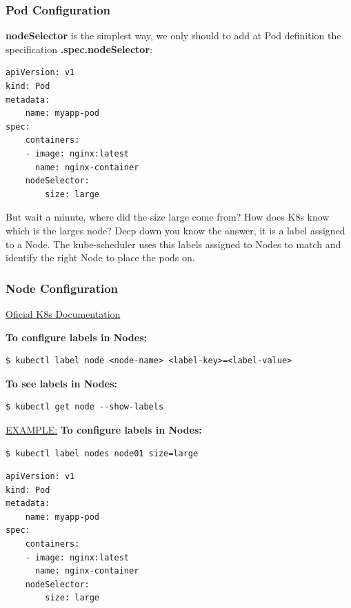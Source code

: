 \documentclass{article}
\newenvironment{codetemplate}[1][]{%
  \mybasecolorbox[#1]
  \itshape
}{%
  \endmybasecolorbox
}
\begin{document}
\subsubsection{Pod Configuration}
\textbf{nodeSelector} is the simplest way, we only should to add at Pod definition the specification \textbf{.spec.nodeSelector}:

\begin{codetemplate}{}
\begin{verbatim}
apiVersion: v1
kind: Pod
metadata:
    name: myapp-pod
spec:
    containers:
    - image: nginx:latest
      name: nginx-container
    nodeSelector:
        size: large
\end{verbatim}
\end{codetemplate}

But wait a minute, where did the size large come from? How does K8s know which is the larges node? Deep down you know the answer, it is a label assigned to a Node. The kube-scheduler uses this labels assigned to Nodes to match and identify the right Node to place the pods on.

\subsubsection{Node Configuration}

\href{https://kubernetes.io/docs/tasks/configure-pod-container/assign-pods-nodes/}{Oficial K8s Documentation}


\textbf{To configure labels in Nodes:}
\begin{codetemplate}{}
\begin{verbatim}
$ kubectl label node <node-name> <label-key>=<label-value>
\end{verbatim}
\end{codetemplate}

\textbf{To see labels in Nodes:}
\begin{codetemplate}{}
\begin{verbatim}
$ kubectl get node --show-labels
\end{verbatim}
\end{codetemplate}

\underline{EXAMPLE:}
\textbf{To configure labels in Nodes:}
\begin{codetemplate}{}
\begin{verbatim}
$ kubectl label nodes node01 size=large
\end{verbatim}
\begin{codetemplate}{}
\begin{verbatim}
apiVersion: v1
kind: Pod
metadata:
    name: myapp-pod
spec:
    containers:
    - image: nginx:latest
      name: nginx-container
    nodeSelector:
        size: large
\end{verbatim}
\end{codetemplate}

\end{codetemplate}
\end{document}
